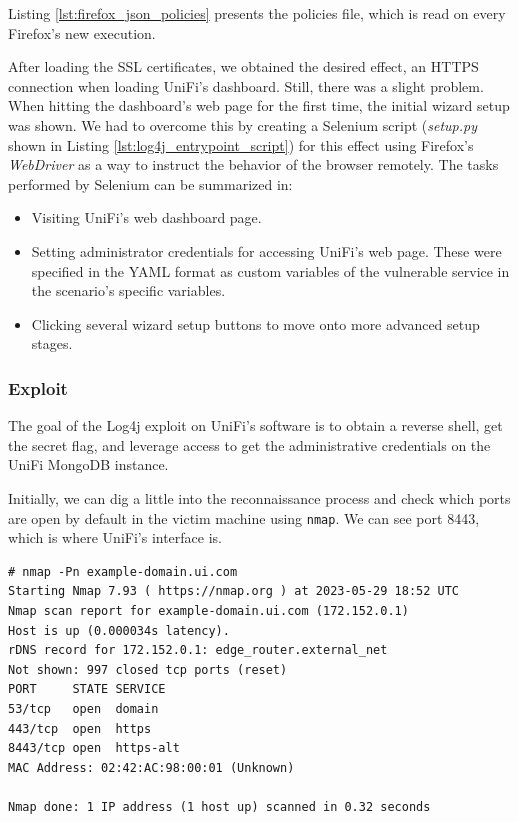 Listing \ref{lst:firefox_json_policies} presents the policies file, which is read on every Firefox's new execution.


After loading the SSL certificates, we obtained the desired effect, an HTTPS connection when loading UniFi's dashboard. Still, there was a slight problem. When hitting the dashboard's web page for the first time, the initial wizard setup was shown. We had to overcome this by creating a Selenium script (\textit{setup.py} shown in Listing \ref{lst:log4j_entrypoint_script}) for this effect using Firefox's \textit{WebDriver} as a way to instruct the behavior of the browser remotely. The tasks performed by Selenium can be summarized in:

\begin{itemize}
    \item Visiting UniFi's web dashboard page.
    \item Setting administrator credentials for accessing UniFi's web page. These were specified in the YAML format as custom variables of the vulnerable service in the scenario's specific variables.
    \item Clicking several wizard setup buttons to move onto more advanced setup stages.
\end{itemize}

\subsubsection{Exploit} \label{sec:validation_log4j_exploit}

The goal of the Log4j exploit on UniFi's software is to obtain a reverse shell, get the secret flag, and leverage access to get the administrative credentials on the UniFi MongoDB instance.

Initially, we can dig a little into the reconnaissance process and check which ports are open by default in the victim machine using \texttt{nmap}. We can see port 8443, which is where UniFi's interface is.

\begin{lstlisting}[caption=Nmap output over victim machine.,numbers=none,label={lst:nmap_victim}]
# nmap -Pn example-domain.ui.com
Starting Nmap 7.93 ( https://nmap.org ) at 2023-05-29 18:52 UTC
Nmap scan report for example-domain.ui.com (172.152.0.1)
Host is up (0.000034s latency).
rDNS record for 172.152.0.1: edge_router.external_net
Not shown: 997 closed tcp ports (reset)
PORT     STATE SERVICE
53/tcp   open  domain
443/tcp  open  https
8443/tcp open  https-alt
MAC Address: 02:42:AC:98:00:01 (Unknown)
 
Nmap done: 1 IP address (1 host up) scanned in 0.32 seconds
\end{lstlisting}

